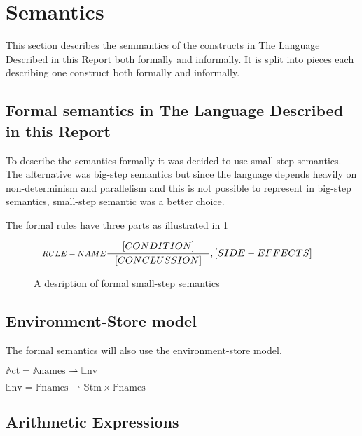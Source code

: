 \section{Semantics}
This section describes the semmantics of the constructs in The Language Described in this Report both formally and informally. It is split into pieces each describing one construct both formally and informally.

\subsection{Formal semantics in The Language Described in this Report}
To describe the semantics formally it was decided to use small-step semantics. The alternative was big-step semantics but since the language depends heavily on non-determinism and parallelism and this is not possible to represent in big-step semantics, small-step semantic was a better choice.

The formal rules have three parts as illustrated in \cref{SS-semantics}

\begin{figure}[H]
\begin{align*}
&\inference[$RULE-NAME$]{[CONDITION]}
												{[CONCLUSSION]}
												{,[SIDE-EFFECTS]}
\end{align*}
\caption{A desription of formal small-step semantics}
\label{SS-semantics}
\end{figure}

\subsection{Environment-Store model}
The formal semantics will also use the environment-store model.


$\mathbb{A}\text{ct} = \mathbb{A}\text{names} \rightharpoonup \mathbb{E}\text{nv}$

$\mathbb{E}\text{nv} = \mathbb{P}\text{names} \rightharpoonup \mathbb{S}\text{tm} \times \mathbb{P}\text{names}$

\subsection{Arithmetic Expressions}
\newcommand{\Twedge}{\mathbin{^\wedge{}}}

